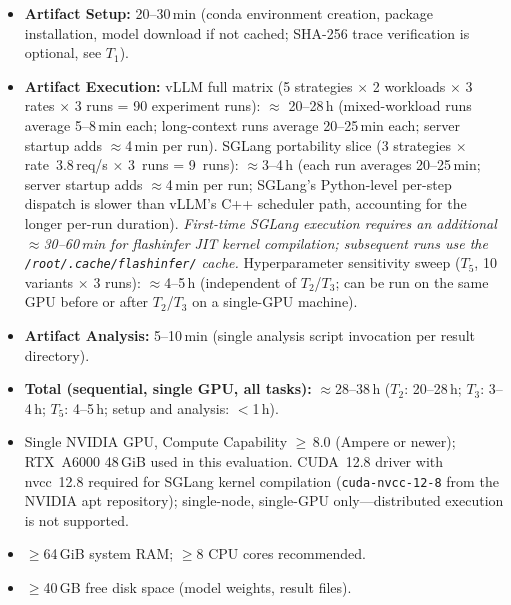 \documentclass[conference]{IEEEtran}
\begin{document}
\begin{itemize}
  \item \textbf{Artifact Setup:} 20--30\,min
    (conda environment creation, package installation, model download if not
    cached; SHA-256 trace verification is optional, see $T_1$).
  \item \textbf{Artifact Execution:}
    vLLM full matrix (5 strategies $\times$ 2 workloads $\times$ 3 rates
    $\times$ 3 runs = 90 experiment runs): $\approx$ 20--28\,h
    (mixed-workload runs average 5--8\,min each; long-context runs average
    20--25\,min each; server startup adds $\approx$4\,min per run).
    SGLang portability slice (3 strategies $\times$ rate~3.8\,req/s $\times$ 3~runs = 9~runs): $\approx$3--4\,h
    (each run averages 20--25\,min; server startup adds $\approx$4\,min per run;
    SGLang's Python-level per-step dispatch is slower than vLLM's
    C++ scheduler path, accounting for the longer per-run duration).
    \textit{First-time SGLang execution requires an additional
    $\approx$30--60\,min for flashinfer JIT kernel compilation;
    subsequent runs use the \texttt{/root/.cache/flashinfer/} cache.}
    Hyperparameter sensitivity sweep ($T_5$, 10 variants $\times$ 3 runs):
    $\approx$4--5\,h (independent of $T_2$/$T_3$; can be run on the same GPU
    before or after $T_2$/$T_3$ on a single-GPU machine).
  \item \textbf{Artifact Analysis:} 5--10\,min
    (single analysis script invocation per result directory).
  \item \textbf{Total (sequential, single GPU, all tasks):}
    $\approx$28--38\,h
    ($T_2$: 20--28\,h; $T_3$: 3--4\,h; $T_5$: 4--5\,h;
    setup and analysis: $<$1\,h).
\end{itemize}

\artin


\begin{itemize}
  \item Single NVIDIA GPU, Compute Capability $\geq$\,8.0 (Ampere or
    newer); RTX~A6000 48\,GiB used in this evaluation.
    CUDA~12.8 driver with nvcc~12.8 required for SGLang kernel
    compilation (\texttt{cuda-nvcc-12-8} from the NVIDIA apt repository);
    single-node, single-GPU only---distributed execution is not supported.
  \item $\geq$64\,GiB system RAM; $\geq$8 CPU cores recommended.
  \item $\geq$40\,GB free disk space (model weights, result files).
\end{itemize}
\end{document}

